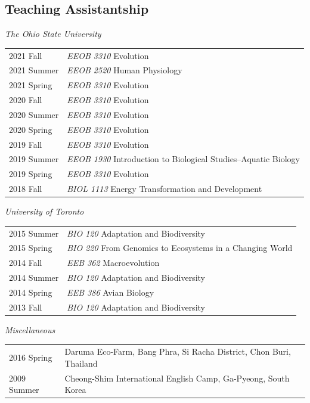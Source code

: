 \documentclass[11pt]{article}
\begin{document}
\subsection*{Teaching Assistantship}

\textit{The Ohio State University}\\
\begin{longtable}{p{}  p{}}

2021 Fall & \textit{EEOB 3310} Evolution\\
2021 Summer & \textit{EEOB 2520} Human Physiology\\
2021 Spring & \textit{EEOB 3310} Evolution\\
2020 Fall & \textit{EEOB 3310} Evolution\\
2020 Summer & \textit{EEOB 3310} Evolution\\
2020 Spring & \textit{EEOB 3310} Evolution\\
2019 Fall & \textit{EEOB 3310} Evolution\\
2019 Summer & \textit{EEOB 1930} Introduction to Biological Studies--Aquatic Biology\\
2019 Spring & \textit{EEOB 3310} Evolution\\
2018 Fall & \textit{BIOL 1113} Energy Transformation and Development\\
\end{longtable}


\textit{University of Toronto}\\
\begin{longtable}{p{}  p{}}

2015 Summer  & \textit{BIO 120} Adaptation and Biodiversity\\
2015 Spring & \textit{BIO 220} From Genomics to Ecosystems in a Changing World\\
2014 Fall & \textit{EEB 362} Macroevolution\\
2014 Summer & \textit{BIO 120} Adaptation and Biodiversity\\
2014 Spring & \textit{EEB 386} Avian Biology\\
2013 Fall & \textit{BIO 120} Adaptation and Biodiversity\\

\end{longtable}

\textit{Miscellaneous}\\
\begin{longtable}{p{}  p{}}
2016 Spring & Daruma Eco-Farm, Bang Phra, Si Racha District, Chon Buri, Thailand\\
2009 Summer & Cheong-Shim International English Camp, Ga-Pyeong, South Korea\\
\end{longtable}
\hspace{0pt}
\end{document}
